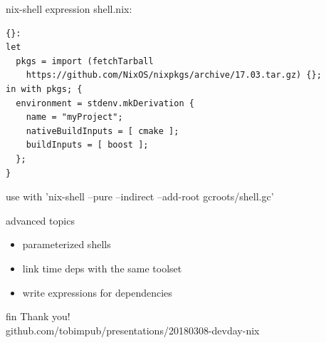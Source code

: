 \documentclass[aspectratio=169]{beamer}
\begin{document}

\begin{frame}[fragile]{nix-shell expression}
    shell.nix:
    \small
\begin{lstlisting}[style=base,breaklines=false]
{}:
let
  pkgs = import (fetchTarball
    https://github.com/NixOS/nixpkgs/archive/17.03.tar.gz) {};
in with pkgs; {
  environment = stdenv.mkDerivation {
    name = "myProject";
    nativeBuildInputs = [ cmake ];
    buildInputs = [ boost ];
  };
}
\end{lstlisting}
use with 'nix-shell --pure --indirect --add-root gcroots/shell.gc'
\end{frame}

\begin{frame}{advanced topics}
    \begin{itemize}
        \item parameterized shells
        \item link time deps with the same toolset
        \item write expressions for dependencies
    \end{itemize}
\end{frame}

\begin{frame}[c]{fin}
\centering
Thank you! \\
github.com/tobimpub/presentations/20180308-devday-nix
\end{frame}
\end{document}

